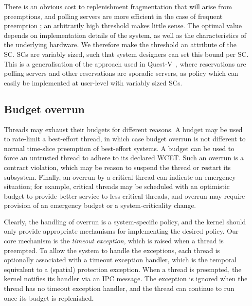 There is an obvious cost to replenishment fragmentation that will
arise from preemptions, and polling servers are more efficient in the
case of frequent preemption \citep{Li_WCM_14}; an arbitrarily high
threshold makes little sense. The optimal value depends on
implementation details of the system, as well as the characteristics
of the underlying hardware.
We therefore make the threshold an attribute of the SC. \glspl{SC} are variably sized,
such that system designers can set this bound per SC. This is a generalisation of the approach used
in Quest-V~\citep{Danish_LW_11}, where \IO reservations are polling servers and other reservations 
are sporadic servers, as policy which can easily be implemented at user-level with variably sized
\glspl{SC}.

\subsection{Budget overrun}\label{s:timeout}

Threads may exhaust their budgets for different reasons. A budget may
be used to rate-limit a best-effort thread, in which case budget
overrun is not different to normal time-slice preemption of
best-effort systems. A budget can be used to force an untrusted thread
to adhere to its declared WCET. Such an overrun is a contract violation, which may be reason
to suspend the thread or restart its subsystem. Finally, an overrun by
a critical thread can indicate an emergency situation; for example,
critical threads may be scheduled with an optimistic budget to provide
better service to less critical threads, and overrun may require
provision of an emergency budget or a system-criticality change.

Clearly, the handling of overrun is a system-specific policy, and the
kernel should only provide appropriate
mechanisms for implementing the desired policy. Our core mechanism is
the \emph{timeout exception}, which is raised when a thread is
preempted. To allow the system to handle the exceptions, each thread
is optionally associated with a timeout exception handler, which is
the temporal equivalent to a (spatial) protection exception. When a
thread is preempted, the kernel notifies its handler via an IPC message. The
exception is ignored when the thread has no timeout exception handler, and the thread
can continue to run once its budget is replenished.

